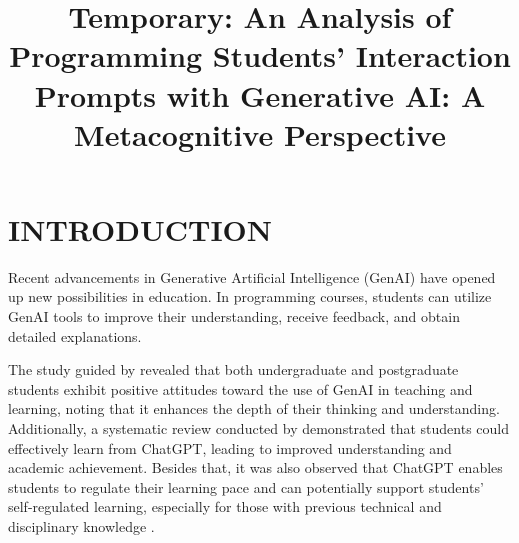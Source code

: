 \documentclass[a4paper,twoside]{article}
\begin{document}
\title{
  Temporary: An Analysis of Programming Students’ Interaction Prompts with
  Generative AI: A Metacognitive Perspective
}

\author{
}



\twocolumn\maketitle\normalsize\setcounter{footnote}{0}

\section{\uppercase{Introduction}}
\label{sec:introduction}

Recent advancements in Generative Artificial Intelligence (GenAI) have opened up
new possibilities in education. In programming courses, students can utilize
GenAI tools to improve their understanding, receive feedback, and obtain
detailed explanations.

The study guided by \cite{chan23} revealed that both undergraduate and
postgraduate students exhibit positive attitudes toward the use of GenAI in
teaching and learning, noting that it enhances the depth of their thinking and
understanding. Additionally, a systematic review conducted by \cite{Lo24}
demonstrated that students could effectively learn from ChatGPT, leading to
improved understanding and academic achievement. Besides that, it was also
observed that ChatGPT enables students to regulate their learning pace
\citep{Baha24} and can potentially support students’ self-regulated learning,
especially for those with previous technical and disciplinary knowledge
\citep{Xia23}.
\end{document}

